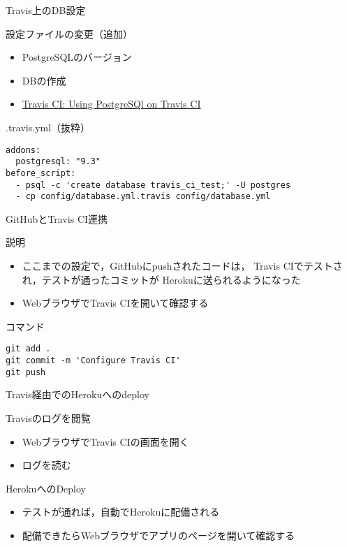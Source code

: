 \documentclass[t, aspectratio=169]{beamer}
\begin{document}
\begin{frame}[fragile,label=sec-7-3-6]{Travis上のDB設定}
 \begin{block}{設定ファイルの変更（追加）}
\begin{itemize}
\item PostgreSQLのバージョン
\item DBの作成
\item \href{http://docs.travis-ci.com/user/using-postgresql/}{Travis CI: Using PostgreSQl on Travis CI}
\end{itemize}
\end{block}
\begin{block}{.travis.yml（抜粋）}
\begin{verbatim}
addons:
  postgresql: "9.3"
before_script:
  - psql -c 'create database travis_ci_test;' -U postgres
  - cp config/database.yml.travis config/database.yml
\end{verbatim}
\end{block}
\end{frame}
\begin{frame}[fragile,label=sec-7-3-7]{GitHubとTravis CI連携}
 \begin{block}{説明}
\begin{itemize}
\item ここまでの設定で，GitHubにpushされたコードは，
Travis CIでテストされ，テストが通ったコミットが
Herokuに送られるようになった
\item WebブラウザでTravis CIを開いて確認する
\end{itemize}
\end{block}

\begin{block}{コマンド}
\begin{verbatim}
git add .
git commit -m 'Configure Travis CI'
git push
\end{verbatim}
\end{block}
\end{frame}
\begin{frame}[label=sec-7-3-8]{Travis経由でのHerokuへのdeploy}
\begin{block}{Travisのログを閲覧}
\begin{itemize}
\item WebブラウザでTravis CIの画面を開く
\item ログを読む
\end{itemize}
\end{block}

\begin{block}{HerokuへのDeploy}
\begin{itemize}
\item テストが通れば，自動でHerokuに配備される
\item 配備できたらWebブラウザでアプリのページを開いて確認する
\end{itemize}
\end{block}
\end{frame}
\end{document}
